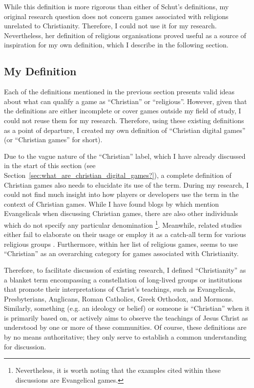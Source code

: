 While this definition is more rigorous than either of Schut's definitions, my original research question does not concern games associated with religions unrelated to Christianity. Therefore, I could not use it for my research. Nevertheless, her definition of religious organisations proved useful as a source of inspiration for my own definition, which I describe in the following section.

\subsection{My Definition} \label{sec:my_definition}

Each of the definitions mentioned in the previous section presents valid ideas about what can qualify a game as ``Christian'' or ``religious''. However, given that the definitions are either incomplete or cover games outside my field of study, I could not reuse them for my research. Therefore, using these existing definitions as a point of departure, I created my own definition of ``Christian digital games'' (or ``Christian games'' for short).

Due to the vague nature of the ``Christian'' label, which I have already discussed in the start of this section (see Section~\ref{sec:what_are_christian_digital_games?}), a complete definition of Christian games also needs to elucidate its use of the term. During my research, I could not find much insight into how players or developers use the term in the context of Christian games. While I have found blogs by \textcite{oliver_why_2014, oliver_christian_2016} which mention Evangelicals when discussing Christian games, there are also other individuals which do not specify any particular denomination \parencite{hartgrove_why_2022, moon_channel_why_2023, monkastery_why_2018}\footnote{Nevertheless, it is worth noting that the examples cited within these discussions are Evangelical games.}. Meanwhile, related studies either fail to elaborate on their usage \parencite{schut_making_2013} or employ it as a catch-all term for various religious groups \parencite{bernauer_playing_2012, schut_swords_2026}. Furthermore, within her list of religious games, \textcite{gonzalez_born-again_2014} seems to use ``Christian'' as an overarching category for games associated with Christianity.

Therefore, to facilitate discussion of existing research, I defined ``Christianity'' as a blanket term encompassing a constellation of long-lived groups or institutions that promote their interpretations of Christ's teachings, such as Evangelicals, Presbyterians, Anglicans, Roman Catholics, Greek Orthodox, and Mormons. Similarly, something (e.g. an ideology or belief) or someone is ``Christian'' when it is primarily based on, or actively aims to observe the teachings of Jesus Christ as understood by one or more of these communities. Of course, these definitions are by no means authoritative; they only serve to establish a common understanding for discussion.

